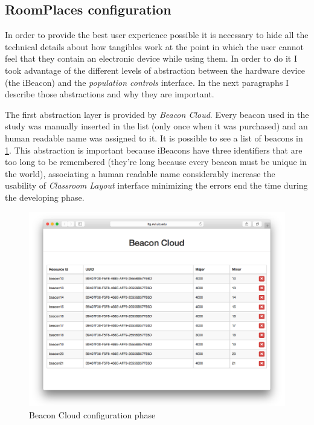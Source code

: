 \subsection{RoomPlaces configuration}
In order to provide the best user experience possible it is necessary to hide all the technical details about how tangibles work at the point in which the user cannot feel that they contain an electronic device while using them. In order to do it I took advantage of the different levels of abstraction between the hardware device (the iBeacon) and the \textit{population controls} interface. In the next paragraphs I describe those abstractions and why they are important.

The first abstraction layer is provided by \textit{Beacon Cloud}. Every beacon used in the study was manually inserted in the list (only once when it was purchased) and an human readable name was assigned to it. It is possible to see a list of beacons in \ref{fig:wallcology_beacon_cloud}. This abstraction is important because iBeacons have three identifiers that are too long to be remembered (they're long because every beacon must be unique in the world), associating a human readable name considerably increase the usability of \textit{Classroom Layout} interface minimizing the errors end the time during the developing phase.

\begin{figure}
\centering
\includegraphics[width=4.5in]{images/wallcology-beacon-cloud.png}
\caption{Beacon Cloud configuration phase}
\label{fig:wallcology_beacon_cloud}
\end{figure}

